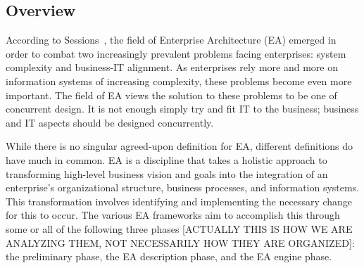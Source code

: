 




\subsection{Overview}
According to Sessions~\cite{sessions2007}, the field of Enterprise Architecture (EA) emerged in order to combat two increasingly prevalent problems facing enterprises: system complexity and business-IT alignment. As enterprises rely more and more on information systems of increasing complexity, these problems become even more important. The field of EA views the solution to these problems to be one of concurrent design. It is not enough simply try and fit IT to the business; business and IT aspects should be designed concurrently. 

While there is no singular agreed-upon definition for EA, different definitions\cite{jungle2004,GartnerInc,ross2006,pearlson2009,lankhorst2009,sessions2007,togaf9.1} do have much in common. EA is a discipline that takes a holistic approach to transforming high-level business vision and goals into the integration of an enterprise's organizational structure, business processes, and information systems. This transformation involves identifying and implementing the necessary change for this to occur. The various EA frameworks aim to accomplish this through some or all of the following three phases [ACTUALLY THIS IS HOW WE ARE ANALYZING THEM, NOT NECESSARILY HOW THEY ARE ORGANIZED]: the preliminary phase, the EA description phase, and the EA engine phase. 

